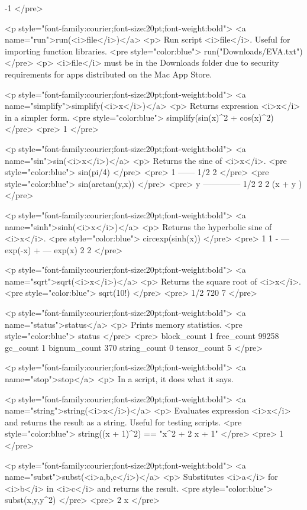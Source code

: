 -1
</pre>

<p style="font-family:courier;font-size:20pt;font-weight:bold">
<a name="run">run(<i>file</i>)</a>
<p>
Run script <i>file</i>.
Useful for importing function libraries.
<pre style="color:blue">
run("Downloads/EVA.txt")
</pre>
<p>
<i>file</i> must be in the Downloads folder due to security requirements for apps distributed on the Mac App Store.

<p style="font-family:courier;font-size:20pt;font-weight:bold">
<a name="simplify">simplify(<i>x</i>)</a>
<p>
Returns expression <i>x</i> in a simpler form.
<pre style="color:blue">
simplify(sin(x)^2 + cos(x)^2)
</pre>
<pre>
1
</pre>

<p style="font-family:courier;font-size:20pt;font-weight:bold">
<a name="sin">sin(<i>x</i>)</a>
<p>
Returns the sine of <i>x</i>.
<pre style="color:blue">
sin(pi/4)
</pre>
<pre>
  1
------
  1/2
 2
</pre>
<pre style="color:blue">
sin(arctan(y,x))
</pre>
<pre>
      y
--------------
          1/2
   2    2
 (x  + y )
</pre>

<p style="font-family:courier;font-size:20pt;font-weight:bold">
<a name="sinh">sinh(<i>x</i>)</a>
<p>
Returns the hyperbolic sine of <i>x</i>.
<pre style="color:blue">
circexp(sinh(x))
</pre>
<pre>
   1             1
- --- exp(-x) + --- exp(x)
   2             2
</pre>

<p style="font-family:courier;font-size:20pt;font-weight:bold">
<a name="sqrt">sqrt(<i>x</i>)</a>
<p>
Returns the square root of <i>x</i>.
<pre style="color:blue">
sqrt(10!)
</pre>
<pre>
     1/2
720 7
</pre>

<p style="font-family:courier;font-size:20pt;font-weight:bold">
<a name="status">status</a>
<p>
Prints memory statistics.
<pre style="color:blue">
status
</pre>
<pre>
block_count 1
free_count 99258
gc_count 1
bignum_count 370
string_count 0
tensor_count 5
</pre>

<p style="font-family:courier;font-size:20pt;font-weight:bold">
<a name="stop">stop</a>
<p>
In a script, it does what it says.

<p style="font-family:courier;font-size:20pt;font-weight:bold">
<a name="string">string(<i>x</i>)</a>
<p>
Evaluates expression <i>x</i> and returns the result as a string.
Useful for testing scripts.
<pre style="color:blue">
string((x + 1)^2) == "x^2 + 2 x + 1"
</pre>
<pre>
1
</pre>

<p style="font-family:courier;font-size:20pt;font-weight:bold">
<a name="subst">subst(<i>a,b,c</i>)</a>
<p>
Substitutes <i>a</i> for <i>b</i> in <i>c</i> and returns the result.
<pre style="color:blue">
subst(x,y,y^2)
</pre>
<pre>
 2
x
</pre>

